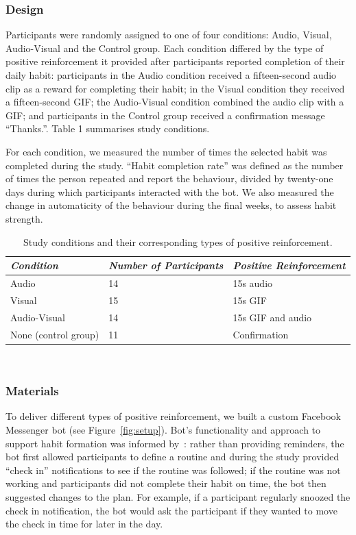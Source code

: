 \documentclass{scaffold/sigchi}
\begin{document}
\subsubsection{Design}
Participants were randomly assigned to one of four conditions: Audio, Visual, Audio-Visual and the Control group. Each condition differed by the type of positive reinforcement it provided after participants reported completion of their daily habit: participants in the Audio condition received a fifteen-second audio clip as a reward for completing their habit; in the Visual condition they received a fifteen-second GIF; the Audio-Visual condition combined the audio clip with a GIF; and participants in the Control group received a confirmation message ``Thanks.''. Table 1 summarises study conditions. 

For each condition, we measured the number of times the selected habit was completed during the study. ``Habit completion rate'' was defined as the number of times the person repeated and report the behaviour, divided by twenty-one days during which participants interacted with the bot. We also measured the change in automaticity of the behaviour during the final weeks, to assess habit strength.


\begin{table}[b]
  \centering   
  \begin{tabular}{l l l}
\multicolumn{1}{l}{\small \textit{Condition}} &
\multicolumn{1}{p{1.4cm}}{\small \textit{Number of Participants}} &
\multicolumn{1}{l}{\small \textit{Positive Reinforcement}} \\
    \midrule
    Audio & 14 & 15s audio\\
    Visual & 15 & 15s GIF \\
    Audio-Visual & 14 & 15s GIF and audio \\
    None (control group) & 11 & Confirmation \\
  \end{tabular}
  \caption{Study conditions and their corresponding types of positive reinforcement.}~\label{fig:precise_rewards}
\end{table}

\subsubsection{Materials}
To deliver different types of positive reinforcement, we built a custom Facebook Messenger bot (see Figure~\ref{fig:setup}). Bot's functionality and approach to support habit formation was informed by~\cite{article_beyond_self_tracking_designing_apps}: rather than providing reminders, the bot first allowed participants to define a routine and during the study provided ``check in'' notifications to see if the routine was followed; if the routine was not working and participants did not complete their habit on time, the bot then suggested changes to the plan. For example, if a participant regularly snoozed the check in notification, the bot would ask the participant if they wanted to move the check in time for later in the day.
\end{document}
